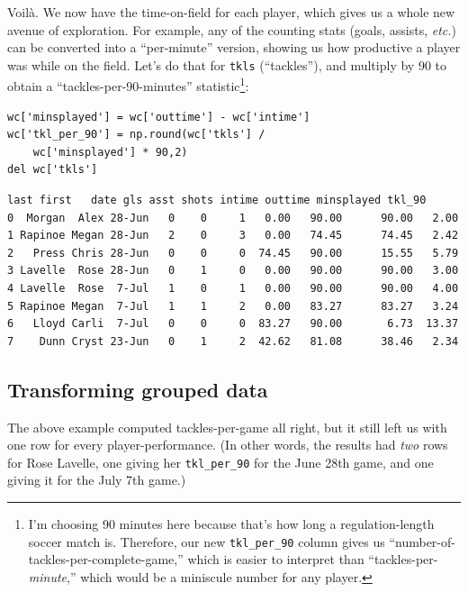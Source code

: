 
Voil\`{a}. We now have the time-on-field for each player, which gives us a
whole new avenue of exploration. For example, any of the counting stats (goals,
assists, \textit{etc.}) can be converted into a ``per-minute'' version, showing
us how productive a player was while on the field. Let's do that for
\texttt{tkls} (``tackles''), and multiply by 90 to obtain a ``tackles-per-90-minutes''
statistic\footnote{I'm choosing 90 minutes here because that's how long a
regulation-length soccer match is. Therefore, our new \texttt{tkl\_per\_90}
column gives us ``number-of-tackles-per-complete-game,'' which is easier to
interpret than ``tackles-per-\textit{minute},'' which would be a miniscule
number for any player.}:

\begin{Verbatim}[fontsize=\small,samepage=true,frame=single,framesep=3mm]
wc['minsplayed'] = wc['outtime'] - wc['intime']
wc['tkl_per_90'] = np.round(wc['tkls'] /
    wc['minsplayed'] * 90,2)
del wc['tkls']
\end{Verbatim}
\vspace{-.2in}

\begin{Verbatim}[fontsize=\CBCodeSmall,samepage=true,frame=leftline,framesep=5mm,framerule=1mm]
     last first   date gls asst shots intime outtime minsplayed tkl_90
0  Morgan  Alex 28-Jun   0    0     1   0.00   90.00      90.00   2.00
1 Rapinoe Megan 28-Jun   2    0     3   0.00   74.45      74.45   2.42
2   Press Chris 28-Jun   0    0     0  74.45   90.00      15.55   5.79
3 Lavelle  Rose 28-Jun   0    1     0   0.00   90.00      90.00   3.00
4 Lavelle  Rose  7-Jul   1    0     1   0.00   90.00      90.00   4.00
5 Rapinoe Megan  7-Jul   1    1     2   0.00   83.27      83.27   3.24
6   Lloyd Carli  7-Jul   0    0     0  83.27   90.00       6.73  13.37
7    Dunn Cryst 23-Jun   0    1     2  42.62   81.08      38.46   2.34
\end{Verbatim}

\subsection{Transforming grouped data}

The above example computed tackles-per-game all right, but it still left us
with one row for every player-performance. (In other words, the results had
\textit{two} rows for Rose Lavelle, one giving her \texttt{tkl\_per\_90} for
the June 28th game, and one giving it for the July 7th game.)

